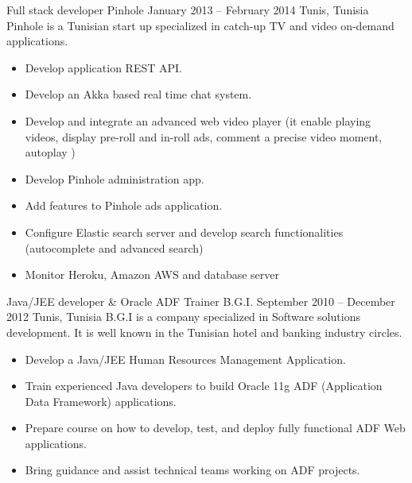 \documentclass[10pt,a4paper]{resume-settings}
\begin{document}
\cvevent
    {Full stack developer}
    {Pinhole}
    {January 2013 -- February 2014}
    {Tunis, Tunisia}
    {Pinhole is a Tunisian start up specialized in catch-up TV and video on-demand applications.}
    \begin{itemize}
        \item Develop application REST API.
        \item Develop an Akka based real time chat system.
        \item Develop and integrate an advanced web video player (it enable playing videos, display pre-roll and in-roll ads, comment a precise video moment, autoplay )
        \item Develop Pinhole administration app.
        \item Add features to Pinhole ads application.
        \item Configure Elastic search server and develop search functionalities (autocomplete and advanced search)
        \item Monitor Heroku, Amazon AWS and database server
    \end{itemize}
\divider

\cvevent
    {Java/JEE developer \& Oracle ADF Trainer}
    {B.G.I.}
    {September 2010 -- December 2012}
    {Tunis, Tunisia}
    {B.G.I is a company specialized in Software solutions development. It is well known in the Tunisian hotel and banking industry circles.}
    \begin{itemize}
        \item Develop a Java/JEE Human Resources Management Application.
        \item Train experienced Java developers to build Oracle 11g ADF (Application Data Framework) applications.
        \item Prepare course on how to develop, test, and deploy fully functional ADF Web applications.
        \item Bring guidance and assist technical teams working on ADF projects.
    \end{itemize}
    
\end{document}
